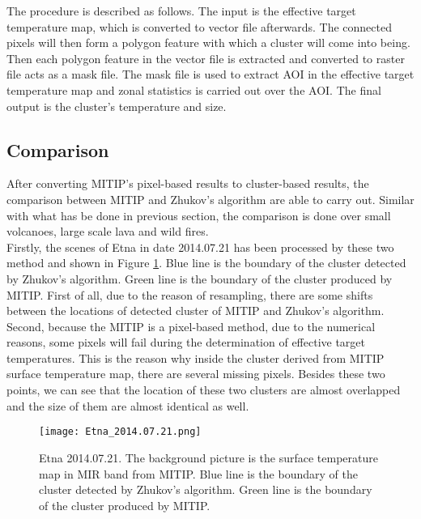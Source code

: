 \noindent The procedure is described as follows. The input is the effective target temperature map, which is converted to vector file afterwards. The connected pixels will then form a polygon feature with which a cluster will come into being. Then each polygon feature in the vector file is extracted and converted to  raster file acts as a mask file. The mask file is used to extract AOI in the effective target temperature map and zonal statistics is carried out over the AOI. The final output is the cluster's temperature and size.\\


\subsection{Comparison}
After converting MITIP's pixel-based results to cluster-based results, the comparison between MITIP and Zhukov's algorithm are able to carry out. Similar with what has be done in previous section, the comparison is done over small volcanoes, large scale lava and wild fires.\\

Firstly, the scenes of Etna in date 2014.07.21 has been processed by these two method and shown in Figure \ref{fig:Etna_comp}. Blue line is the boundary of the cluster detected by Zhukov's algorithm. Green line is the boundary of the cluster produced by MITIP. First of all, due to the reason of resampling, there are some shifts between the locations of detected cluster of MITIP and Zhukov's algorithm. Second, because the MITIP is a pixel-based method, due to the numerical reasons, some pixels will fail during the determination of effective target temperatures. This is the reason why inside the cluster derived from MITIP surface temperature map, there are several missing pixels. Besides these two points, we can see that the location of these two clusters are almost overlapped and the size of them are almost identical as well.\\

\begin{figure}[!htbp]
\centering
\texttt{[image: Etna\_2014.07.21.png]}
\caption{Etna 2014.07.21. The background picture is the surface temperature map in MIR band from MITIP. Blue line is the boundary of the cluster detected by Zhukov's algorithm. Green line is the boundary of the cluster produced by MITIP.}
\label{fig:Etna_comp}
\end{figure}

